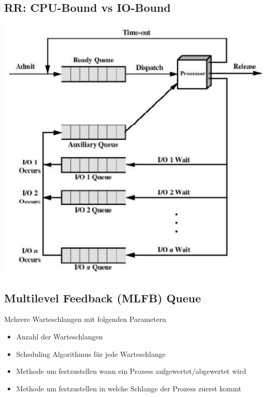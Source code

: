 \documentclass[a4paper]{scrreprt}
\begin{document}
\subsection{RR: CPU-Bound vs IO-Bound}
\includegraphics[scale = 0.6]{graphics/virtual_rr}
\subsection{Multilevel Feedback (MLFB) Queue}
Mehrere Warteschlangen mit folgenden Parametern
\begin{itemize}
\item Anzahl der Warteschlangen
\item Scheduling Algorithmus für jede Warteschlange
\item Methode um festzustellen wann ein Prozess aufgewertet/abgewertet wird
\item Methode um festzustellen in welche Schlange der Prozess zuerst kommt
\end{itemize}
\end{document}
